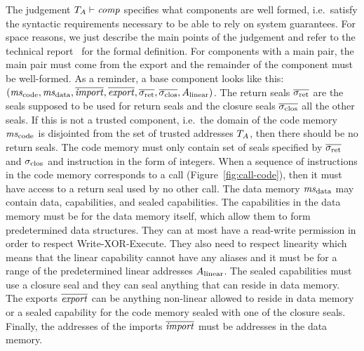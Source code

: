 \documentclass[acmsmall,review,anonymous]{acmart}\settopmatter{printfolios=true,printccs=false,printacmref=false}
\renewcommand{\comp}{\var{comp}}
\newcommand{\wdjud}[2][ ]{#1 \vdash #2}
\begin{document}
The judgement $\wdjud[\ta]{\comp}$ specifies what components are well formed, i.e.\ satisfy the syntactic requirements necessary to be able to rely on system guarantees.
For space reasons, we just describe the main points of the judgement and refer to the technical report~\citep{technical_report} for the formal definition.
For components with a main pair, the main pair must come from the export and the remainder of the component must be well-formed.
As a reminder, a base component looks like this: $(\mscode,\msdata,\overline{\var{import}},\overline{\var{export}},\sigrets,\sigcloss,A_\linear)$.
The return seals $\sigrets$ are the seals supposed to be used for return seals and the closure seals $\sigcloss$ all the other seals.
If this is not a trusted component, i.e.\ the domain of the code memory $\mscode$ is disjointed from the set of trusted addresses $T_{A}$, then there should be no return seals.
The code memory must only contain set of seals specified by $\sigrets$ and $\sigclos$ and instruction in the form of integers.
When a sequence of instructions in the code memory corresponds to a call (Figure~\ref{fig:call-code}), then it must have access to a return seal used by no other call.
The data memory $\msdata$ may contain data, capabilities, and sealed capabilities.
The capabilities in the data memory must be for the data memory itself, which allow them to form predetermined data structures.
They can at most have a read-write permission in order to respect Write-XOR-Execute.
They also need to respect linearity which means that the linear capability cannot have any aliases and it must be for a range of the predetermined linear addresses $A_{\mathrm{linear}}$.
The sealed capabilities must use a closure seal and they can seal anything that can reside in data memory.
The exports $\overline{\mathit{export}}$ can be anything non-linear allowed to reside in data memory or a sealed capability for the code memory sealed with one of the closure seals.
Finally, the addresses of the imports $\overline{\mathit{import}}$ must be addresses in the data memory.
\end{document}
